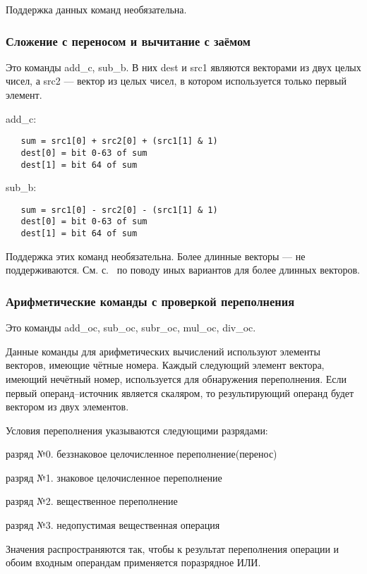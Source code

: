 \documentclass[forwardcom.tex]{subfiles}
\begin{document}
Поддержка данных команд необязательна.

\subsubsection{Сложение с переносом и вычитание с заёмом} \label{addWithCarryInstruction}
Это команды add\_c, sub\_b. В них dest и src1 являются векторами из двух целых чисел, а src2 --- вектор из целых чисел, в котором используется только первый элемент.

add\_c: 
\begin{verbatim}
   sum = src1[0] + src2[0] + (src1[1] & 1)
   dest[0] = bit 0-63 of sum 
   dest[1] = bit 64 of sum
\end{verbatim}

sub\_b:
\begin{verbatim}
   sum = src1[0] - src2[0] - (src1[1] & 1)
   dest[0] = bit 0-63 of sum 
   dest[1] = bit 64 of sum
\end{verbatim}

Поддержка этих команд необязательна. Более длинные векторы --- не поддерживаются. См. с.~\pageref{highPrecisionArithmetic} по поводу иных вариантов для более длинных векторов.

\subsubsection{Арифметические команды с проверкой переполнения} \label{instructionsWithOverflowCheck}
Это команды add\_oc, sub\_oc, subr\_oc, mul\_oc, div\_oc.

Данные команды для арифметических вычислений используют элементы векторов, имеющие чётные номера. Каждый следующий элемент вектора, имеющий нечётный номер, используется для обнаружения переполнения. Если первый операнд--источник является скаляром, то результирующий операнд будет вектором из двух элементов.

Условия переполнения указываются следующими разрядами:

разряд №0. беззнаковое целочисленное переполнение(перенос)

разряд №1. знаковое целочисленное переполнение

разряд №2. вещественное переполнение

разряд №3. недопустимая вещественная операция

Значения распространяются так, чтобы к результат переполнения операции и обоим входным операндам применяется поразрядное ИЛИ.
\end{document}
